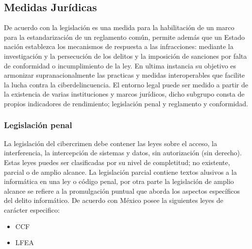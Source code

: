 \documentclass[runningheads,a4paper]{llncs}
\begin{document}
\subsection{Medidas Jurídicas}
De acuerdo con \cite{GCSI_1} la legislación es una medida para la habilitación de un marco para la estandarización de un reglamento común, permite además que un Estado nación establezca los mecanismos de respuesta a las infracciones: mediante la investigación y la persecución de los delitos y la imposición de sanciones por falta de conformidad o incumplimiento de la ley. En ultima instancia su objetivo es armonizar supranacionalmente las practicas y medidas interoperables que facilite la lucha contra la ciberdelincuencia.  El entorno legal puede ser medido a partir de la existencia de varias instituciones y marcos jurídicos, dicho subgrupo consta de propios indicadores de rendimiento; legislación penal y reglamento y conformidad.\\

\subsubsection{Legislación penal}
La legislación del cibercrimen debe contener las leyes sobre el acceso, la interferencia, la intercepción de sistemas y datos, sin autorización (sin derecho). Estas leyes puedes ser clasificadas por su nivel de completitud; no existente, parcial o de amplio alcance. La legislación parcial contiene textos alusivos a la informática en una ley o código penal, por otra parte la legislación de amplio alcance se refiere a la promulgación puntual que aborda los aspectos específicos del delito informático. De acuerdo con \cite{GCSI_1}    México posee la siguientes leyes de carácter especifico:

\begin{itemize}
	\item \gls{CCF}
	\item \gls{LFEA}
\end{itemize}
 



\printnoidxglossaries     


\end{document}
